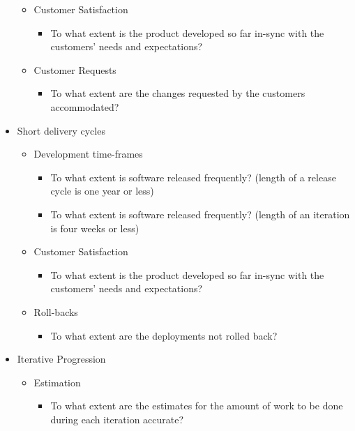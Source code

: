 \begin{appendices}
\begin{itemize}
\begin{itemize}
			\item Customer Satisfaction
				\begin{itemize}
					\item To what extent is the product developed so far in-sync with the customers' needs and expectations?
				\end{itemize}
			\item Customer Requests
				\begin{itemize}
					\item To what extent are the changes requested by the customers accommodated?
				\end{itemize}			
		\end{itemize}
	\item Short delivery cycles
		\begin{itemize}
			\item Development time-frames
				\begin{itemize}
					\item To what extent is software released frequently? (length of a release cycle is one year or less)
					\item To what extent is software released frequently? (length of an iteration is four weeks or less)
				\end{itemize}
			\item Customer Satisfaction
				\begin{itemize}
					\item To what extent is the product developed so far in-sync with the customers' needs and expectations?
				\end{itemize}
			\item Roll-backs
				\begin{itemize}
					\item To what extent are the deployments not rolled back?
				\end{itemize}
		\end{itemize}
	\item Iterative Progression
		\begin{itemize}
			\item Estimation
				\begin{itemize}
					\item To what extent are the estimates for the amount of work to be done during each iteration accurate?
				\end{itemize}

\end{itemize}
\end{itemize}
\end{appendices}
